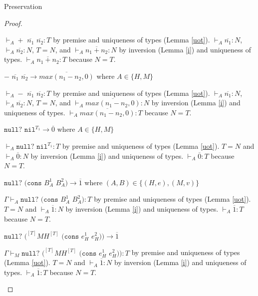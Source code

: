 \begin{theorem}{Preservation}
\begin{proof}
\begin{case}
$\vdash_{A}+$ $\overline{n_{1}}$ $\overline{n_{2}}:T$ by premise and uniqueness of types (Lemma \ref{uot}).  $\vdash_{A}\overline{n_{1}}:N$, $\vdash_{A}\overline{n_{2}}:N$, $T=N$, and $\vdash_{A}\overline{n_{1}+n_{2}}:N$ by inversion (Lemma \ref{i}) and uniqueness of types.  $\vdash_{A}\overline{n_{1}+n_{2}}:T$ because $N=T$.
\end{case}


\begin{case}
$-$ $\overline{n_{1}}$ $\overline{n_{2}}\rightarrow\overline{max(n_{1}-n_{2},0)}$ where $A\in\lbrace H,M\rbrace$

$\vdash_{A}-$ $\overline{n_{1}}$ $\overline{n_{2}}:T$ by premise and uniqueness of types (Lemma \ref{uot}).  $\vdash_{A}\overline{n_{1}}:N$, $\vdash_{A}\overline{n_{2}}:N$, $T=N$, and $\vdash_{A}\overline{max(n_{1}-n_{2},0)}:N$ by inversion (Lemma \ref{i}) and uniqueness of types.  $\vdash_{A}\overline{max(n_{1}-n_{2},0)}:T$ because $N=T$.
\end{case}


\begin{case}
$\mathtt{null?}$ $\mathtt{nil}^{T_{1}}\rightarrow\overline{0}$ where $A\in\lbrace H,M\rbrace$

$\vdash_{A}\mathtt{null?}$ $\mathtt{nil}^{T_{1}}:T$ by premise and uniqueness of types (Lemma \ref{uot}).  $T=N$ and $\vdash_{A}\overline{0}:N$ by inversion (Lemma \ref{i}) and uniqueness of types.  $\vdash_{A}\overline{0}:T$ because $N=T$.
\end{case}


\begin{case}
$\mathtt{null?}$ $(\mathtt{cons}$ $B_{A}^{1}$ $B_{A}^{2})\rightarrow\overline{1}$ where $(A,B)\in\lbrace(H,e),(M,v)\rbrace$

$\Gamma\vdash_{A}\mathtt{null?}$ $(\mathtt{cons}$ $B_{A}^{1}$ $B_{A}^{2}):T$ by premise and uniqueness of types (Lemma \ref{uot}).  $T=N$ and $\vdash_{A}\overline{1}:N$ by inversion (Lemma \ref{i}) and uniqueness of types.  $\vdash_{A}\overline{1}:T$ because $N=T$.
\end{case}


\begin{case}
$\mathtt{null?}$ $(^{[T]}MH^{[T]}$ $(\mathtt{cons}$ $e_{H}^{1}$ $e_{H}^{2}))\rightarrow\overline{1}$

$\Gamma\vdash_{M}\mathtt{null?}$ $(^{[T]}MH^{[T]}$ $(\mathtt{cons}$ $e_{H}^{1}$ $e_{H}^{2})):T$ by premise and uniqueness of types (Lemma \ref{uot}).  $T=N$ and $\vdash_{A}\overline{1}:N$ by inversion (Lemma \ref{i}) and uniqueness of types.  $\vdash_{A}\overline{1}:T$ because $N=T$.
\end{case}


\end{proof}
\end{theorem}
